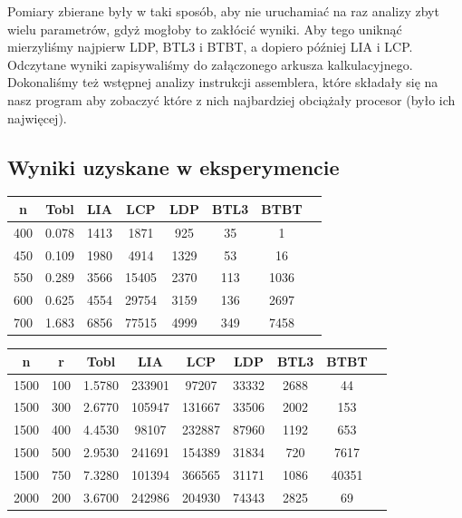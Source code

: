 \documentclass[10pt,a4paper]{article}
\begin{document}
Pomiary zbierane były w taki sposób, aby nie uruchamiać na raz analizy zbyt wielu
parametrów, gdyż mogłoby to zakłócić wyniki. Aby tego uniknąć mierzyliśmy najpierw 
LDP, BTL3 i BTBT, a dopiero później LIA i LCP. Odczytane wyniki zapisywaliśmy do 
załączonego arkusza kalkulacyjnego. Dokonaliśmy też wstępnej analizy instrukcji
assemblera, które składały się na nasz program aby zobaczyć które z nich najbardziej
obciążały procesor (było ich najwięcej).
\subsection{Wyniki uzyskane w eksperymencie}
\begin{center}
	\begin{tabular}{ |c|c|c|c|c|c|c|c| }
		\hline
		n   & Tobl  & LIA  & LCP   & LDP  & BTL3 & BTBT \\
		\hline
		400 & 0.078 & 1413 & 1871  & 925  & 35   & 1    \\
		\hline
		450 & 0.109 & 1980 & 4914  & 1329 & 53   & 16   \\
		\hline
		550 & 0.289 & 3566 & 15405 & 2370 & 113  & 1036 \\
		\hline
		600 & 0.625 & 4554 & 29754 & 3159 & 136  & 2697 \\
		\hline
		700 & 1.683 & 6856 & 77515 & 4999 & 349  & 7458 \\
		\hline
	\end{tabular}
\end{center}

\begin{center}
	\begin{tabular}{ |c|c|c|c|c|c|c|c|c| }
		\hline
		n    & r   & Tobl   & LIA    & LCP    & LDP   & BTL3 & BTBT  \\
		\hline
		1500 & 100 & 1.5780 & 233901 & 97207  & 33332 & 2688 & 44    \\
		\hline
		1500 & 300 & 2.6770 & 105947 & 131667 & 33506 & 2002 & 153   \\
		\hline
		1500 & 400 & 4.4530 & 98107  & 232887 & 87960 & 1192 & 653   \\
		\hline
		1500 & 500 & 2.9530 & 241691 & 154389 & 31834 & 720  & 7617  \\
		\hline
		1500 & 750 & 7.3280 & 101394 & 366565 & 31171 & 1086 & 40351 \\
		\hline
		2000 & 200 & 3.6700 & 242986 & 204930 & 74343 & 2825 & 69    \\
		\hline
	\end{tabular}
\end{center}
\end{document}
